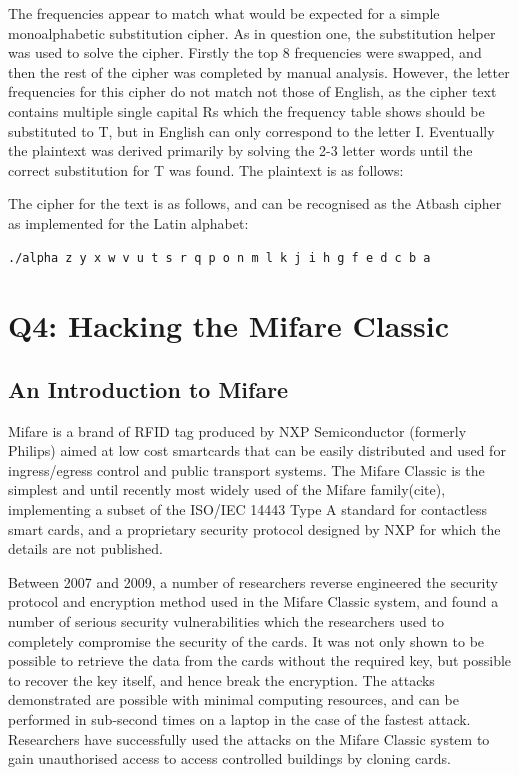 \documentclass[pdflatex, a4paper,12pt]{article}
\begin{document}
The frequencies appear to match what would be expected for a simple
monoalphabetic substitution cipher. As in question one, the substitution helper
was used to solve the cipher.
Firstly the top 8 frequencies were swapped, and then the rest of the cipher was
completed by manual analysis. However, the letter frequencies for this cipher
do not match not those of English, as the cipher text contains multiple single capital
Rs which the frequency table shows should be substituted to T, but in English
can only correspond to the letter I. Eventually the plaintext was derived
primarily by solving the 2-3 letter words until the correct substitution for T
was found. The plaintext is as follows:

\begin{quote}
    
\end{quote}    

The cipher for the text is as follows, and can be recognised as the Atbash
cipher as implemented for the Latin alphabet:

\begin{verbatim}
./alpha z y x w v u t s r q p o n m l k j i h g f e d c b a
\end{verbatim}

\section{Q4: Hacking the Mifare Classic}

\subsection{An Introduction to Mifare}

Mifare is a brand of RFID tag produced by NXP Semiconductor (formerly Philips)
aimed at low cost smartcards that can be easily distributed and used for
ingress/egress control and public transport systems. The Mifare Classic is the
simplest and until recently most widely used of the Mifare family(cite),
implementing a subset of the ISO/IEC 14443 Type A standard for contactless smart
cards, and a proprietary security protocol designed by NXP for which the details
are not published.

Between 2007 and 2009, a number of researchers reverse engineered the security
protocol and encryption method used in the Mifare Classic system, and found a
number of serious security vulnerabilities which the researchers used to
completely compromise the security of the cards. It was not only shown to be
possible to retrieve the data from the cards without the required key, but
possible to recover the key itself, and hence break the encryption. The attacks
demonstrated are possible with minimal computing resources, and can be performed
in sub-second times on a laptop in the case of the fastest attack. Researchers
have successfully used the attacks on the Mifare Classic system to gain unauthorised
access to access controlled buildings by cloning
cards\cite{digitalsecurityrun_mifare_2008}.
\end{document}
